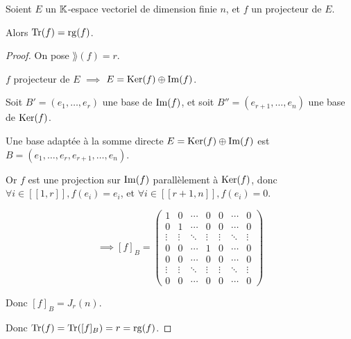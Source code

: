 \documentclass[12pt, a4paper]{report}
\begin{document}
\begin{property}
    Soient $E$ un $\mathbb{K}$-espace vectoriel de dimension finie $n$, et $f$ un projecteur de $E$.

    Alors $\mathrm{Tr}(f) = \mathrm{rg}(f)$.
\end{property}

\begin{proof}
    On pose $\rang(f) = r$.

    $f$ projecteur de $E$ $\implies$ $E = \mathrm{Ker}(f) \oplus \mathrm{Im}(f)$.

    Soit $B' = (e_1,\dots,e_r)$ une base de $\mathrm{Im}(f)$, et soit $B'' = (e_{r+1},\dots,e_n)$ une base de $\mathrm{Ker}(f)$.

    Une base adaptée à la somme directe $E = \mathrm{Ker}(f) \oplus \mathrm{Im}(f)$ est $B = (e_1,\dots,e_r,e_{r+1},\dots,e_n)$.

    Or $f$ est une projection sur $\mathrm{Im}(f)$ parallèlement à $\mathrm{Ker}(f)$, donc $\forall i \in [\![1,r]\!], f(e_i) = e_i$, et $\forall i \in [\! [r+1,n]\!], f(e_i) = 0$.

    $$\implies [f]_B = \left(\begin{matrix}
        1 & 0 & \cdots & 0 & 0 & \cdots & 0 \\
        0 & 1 & \cdots & 0 & 0 & \cdots & 0 \\
        \vdots & \vdots & \ddots & \vdots & \vdots & \ddots & \vdots \\
        0 & 0 & \cdots & 1 & 0 & \cdots & 0 \\
        0 & 0 & \cdots & 0 & 0 & \cdots & 0 \\
        \vdots & \vdots & \ddots & \vdots & \vdots & \ddots & \vdots \\
        0 & 0 & \cdots & 0 & 0 & \cdots & 0
    \end{matrix}\right)$$

    Donc $[f]_B = J_r(n)$.

    Donc $\mathrm{Tr}(f) = \mathrm{Tr}([f]_B) = r = \mathrm{rg}(f)$.
\end{proof}
\end{document}
